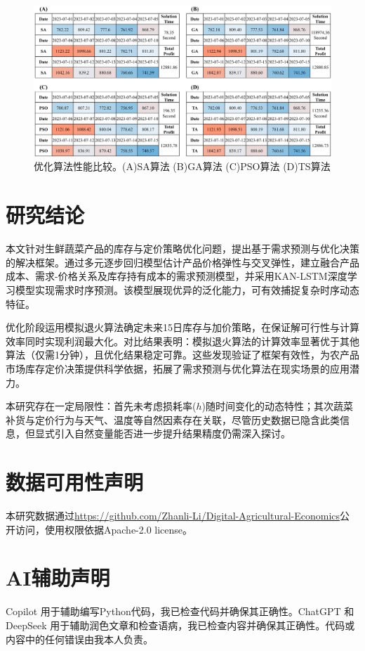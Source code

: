 \documentclass[lang=cn,12pt,a4paper]{elegantpaper}
\begin{document}
\begin{figure}[H]
    \centering
    \includegraphics[width=1\textwidth]{图片9.png}
    \caption{优化算法性能比较。(A)SA算法 (B)GA算法 (C)PSO算法 (D)TS算法}
    \label{fig:fig9}
\end{figure}
\section{研究结论}
\label{sec:conclusions}

本文针对生鲜蔬菜产品的库存与定价策略优化问题，提出基于需求预测与优化决策的解决框架。通过多元逐步回归模型估计产品价格弹性与交叉弹性，建立融合产品成本、需求-价格关系及库存持有成本的需求预测模型，并采用KAN-LSTM深度学习模型实现需求时序预测。该模型展现优异的泛化能力，可有效捕捉复杂时序动态特征。

优化阶段运用模拟退火算法确定未来15日库存与加价策略，在保证解可行性与计算效率同时实现利润最大化。对比结果表明：模拟退火算法的计算效率显著优于其他算法（仅需1分钟），且优化结果稳定可靠。这些发现验证了框架有效性，为农产品市场库存定价决策提供科学依据，拓展了需求预测与优化算法在现实场景的应用潜力。

本研究存在一定局限性：首先未考虑损耗率($h$)随时间变化的动态特性；其次蔬菜补货与定价行为与天气、温度等自然因素存在关联，尽管历史数据已隐含此类信息，但显式引入自然变量能否进一步提升结果精度仍需深入探讨。
\newpage
\section*{数据可用性声明}
本研究数据通过\url{https://github.com/Zhanli-Li/Digital-Agricultural-Economics}公开访问，使用权限依据Apache-2.0 license。
\section*{AI辅助声明}
Copilot 用于辅助编写Python代码，我已检查代码并确保其正确性。ChatGPT 和 DeepSeek 用于辅助润色文章和检查语病，我已检查内容并确保其正确性。代码或内容中的任何错误由我本人负责。
\newpage
\nocite{*}
\printbibliography[heading=bibintoc, title=\ebibname]
\newpage
\appendix
\addappheadtotoc
\end{document}

